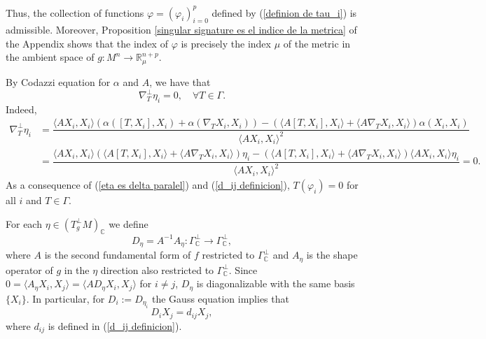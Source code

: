 \documentclass{article}
\theoremstyle{remark}
\begin{document}
Thus, the collection of functions $\varphi=(\varphi_i)_{i=0}^p$ defined by (\ref{definion de tau_i}) is admissible. 
Moreover, Proposition \ref{singular signature es el indice de la metrica} of the Appendix shows that the index of $\varphi$ is precisely the index $\mu$ of the metric in the ambient space of $g:M^{n}\rightarrow\mathbb{R}^{n+p}_{\mu}$. 

By Codazzi equation for $\alpha$ and $A$, we have that
\begin{equation}\label{eta es delta paralel}
    \nabla^\perp_T\eta_i=0,\quad\forall T\in\Gamma.
\end{equation}
Indeed,
\begin{align*}
    \nabla_T^\perp\eta_i&=\dfrac{\langle AX_i,X_i\rangle(\alpha([T,X_i],X_i)+\alpha(\nabla_TX_i,X_i))-(\langle A[T,X_i],X_i\rangle+\langle A\nabla_TX_i,X_i\rangle)\alpha(X_i,X_i)}{\langle AX_i,X_i\rangle^2}\\
    &=\dfrac{\langle AX_i,X_i\rangle(\langle A[T,X_i],X_i\rangle+\langle A\nabla_TX_i,X_i\rangle)\eta_i-(\langle A[T,X_i],X_i\rangle+\langle A\nabla_TX_i,X_i\rangle)\langle AX_i,X_i\rangle\eta_i}{\langle AX_i,X_i\rangle^2}=0.
\end{align*}
As a consequence of (\ref{eta es delta paralel}) and (\ref{d_ij definicion}), $T(\varphi_i)=0$ for all $i$ and $T\in\Gamma$.

For each $\eta\in (T^\perp _g M)_{\mathbb{C}}$ we define
\begin{equation}\label{definicion de D_eta}
    D_{\eta}=A^{-1}A_{\eta}:\Gamma_{\mathbb{C}}^\perp\rightarrow\Gamma_{\mathbb{C}}^\perp,
\end{equation}
where $A$ is the second fundamental form of $f$ restricted to $\Gamma_{\mathbb{C}}^\perp$ and $A_{\eta}$ is the shape operator of $g$ in the $\eta$ direction also restricted to $\Gamma_{\mathbb{C}}^\perp$.
Since $0=\langle A_\eta X_i,X_j\rangle=\langle AD_\eta X_i,X_j\rangle$ for $i\neq j$, $D_\eta$ is diagonalizable with the same basis $\{X_i\}$. In particular, for $D_i:=D_{\eta_i}$ the Gauss equation implies that
$$D_iX_j=d_{ij}X_j,$$ 
where $d_{ij}$ is defined in (\ref{d_ij definicion}). 
\end{document}
